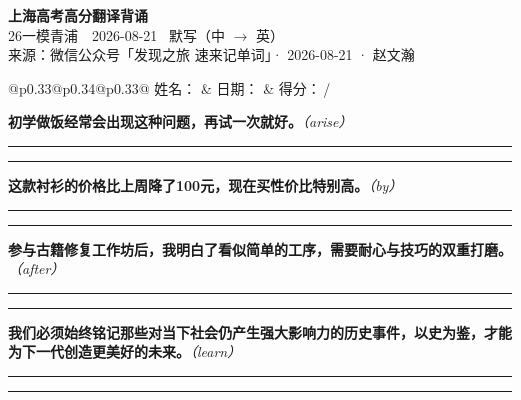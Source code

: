 \documentclass[11pt,a4paper]{article}
\newcommand{\num}[1]{\makebox[1.9em][r]{#1.}\hspace{0.3em}}
\newcommand{\wline}{\noindent\rule{\linewidth}{0.4pt}}
\newcommand{\prompt}[1]{\emph{\textcolor{tipblue}{\small（#1）}}}
\begin{document}
\pagestyle{plain}
\begin{center}
{\LARGE\bfseries 上海高考高分翻译背诵 }\\[0.25em]
{\large 26一模青浦　2026-08-21 \quad\ 默写（中 $\to$ 英）}\\[0.35em]
{\footnotesize 来源：微信公众号「发现之旅 速来记单词」· 2026-08-21 · 赵文瀚}
\end{center}

\vspace{0.4em}
\noindent\begin{tabular}{@{}p{0.33\textwidth}@{}p{0.34\textwidth}@{}p{0.33\textwidth}@{}}
姓名：\underline{\hspace{2.0cm}} & 日期：\underline{\hspace{2.0cm}} & 得分：\underline{\hspace{1.4cm}}\,/ \\
\end{tabular}

\vspace{0.5em}

\vspace{0.8em}
\num{1}\textbf{初学做饭经常会出现这种问题，再试一次就好。}\prompt{arise}

\vspace{0.3em}

\wline\vspace{0.3em}
\wline

\num{2}\textbf{这款衬衫的价格比上周降了100元，现在买性价比特别高。}\prompt{by}

\vspace{0.3em}

\wline\vspace{0.3em}
\wline

\num{3}\textbf{参与古籍修复工作坊后，我明白了看似简单的工序，需要耐心与技巧的双重打磨。}\prompt{after}

\vspace{0.3em}

\wline\vspace{0.3em}
\wline

\num{4}\textbf{我们必须始终铭记那些对当下社会仍产生强大影响力的历史事件，以史为鉴，才能为下一代创造更美好的未来。}\prompt{learn}

\vspace{0.3em}

\wline\vspace{0.3em}
\wline
\end{document}
